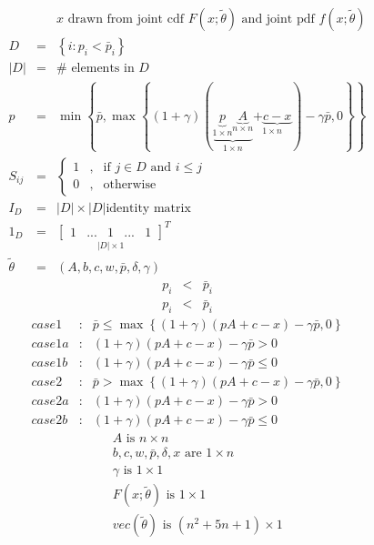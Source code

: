 \documentclass{article}
\begin{document}
\begin{eqnarray*}
&&x\text{ drawn from joint cdf }F\left( x;\tilde{\theta}\right) \text{ and
joint pdf }f\left( x;\tilde{\theta}\right)  \\
D &=&\left\{ i:p_{i}<\bar{p}_{i}\right\}  \\
\left\vert D\right\vert  &=&\#\text{ elements in }D \\
p &=&\min \left\{ \bar{p},\max \left\{ \left( 1+\gamma \right) \left( 
\underset{1\times n}{\underbrace{\underset{1\times n}{\underbrace{p}}%
\underset{n\times n}{\underbrace{A}}}}\underset{1\times n}{+\underbrace{c-x}}%
\right) -\gamma \bar{p},0\right\} \right\}  \\
S_{ij} &=&\left\{ 
\begin{array}{ccc}
1 & , & \text{if }j\in D\text{ and }i\leq j \\ 
0 & , & \text{otherwise}%
\end{array}%
\right.  \\
I_{D} &=&\left\vert D\right\vert \times \left\vert D\right\vert \text{
identity matrix} \\
1_{D} &=&\underset{\left\vert D\right\vert \times 1}{\left[ 
\begin{array}{ccccc}
1 & ... & 1 & ... & 1%
\end{array}%
\right] }^{T} \\
\tilde{\theta} &=&\left( A,b,c,w,\bar{p},\delta ,\gamma \right) 
\end{eqnarray*}%
\begin{eqnarray*}
p_{i} &<&\bar{p}_{i} \\
p_{i} &<&\bar{p}_{i}
\end{eqnarray*}%
\begin{eqnarray*}
case1 &:&\bar{p}\leq \max \left\{ \left( 1+\gamma \right) \left(
pA+c-x\right) -\gamma \bar{p},0\right\}  \\
case1a &:&\left( 1+\gamma \right) \left( pA+c-x\right) -\gamma \bar{p}>0 \\
case1b &:&\left( 1+\gamma \right) \left( pA+c-x\right) -\gamma \bar{p}\leq 0
\end{eqnarray*}%
\begin{eqnarray*}
case2 &:&\bar{p}>\max \left\{ \left( 1+\gamma \right) \left( pA+c-x\right)
-\gamma \bar{p},0\right\}  \\
case2a &:&\left( 1+\gamma \right) \left( pA+c-x\right) -\gamma \bar{p}>0 \\
case2b &:&\left( 1+\gamma \right) \left( pA+c-x\right) -\gamma \bar{p}\leq 0
\end{eqnarray*}%
\begin{eqnarray*}
&&A\text{ is }n\times n \\
&&b,c,w,\bar{p},\delta ,x\text{ are }1\times n \\
&&\gamma \text{ is }1\times 1 \\
&&F\left( x;\tilde{\theta}\right) \text{ is }1\times 1 \\
&&vec\left( \tilde{\theta}\right) \text{ is }\left( n^{2}+5n+1\right) \times
1
\end{eqnarray*}
\end{document}
